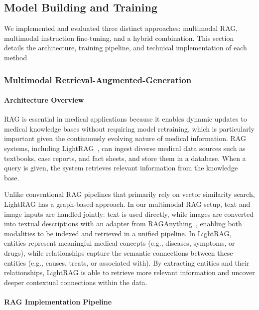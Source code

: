 \subsection{Model Building and Training}
\label{sec:model-building}

We implemented and evaluated three distinct approaches: multimodal \ac{RAG}, multimodal instruction
fine-tuning, and a hybrid combination. This section details the architecture, training pipeline, and technical implementation of each method

\subsubsection{Multimodal Retrieval-Augmented-Generation}
\label{sec:rag-pipeline}

\paragraph{Architecture Overview}

\ac{RAG} is essential in medical applications because it enables dynamic updates to medical knowledge bases without requiring model retraining, which is particularly important given the continuously evolving nature of medical information. \ac{RAG} systems, including LightRAG~\cite{lightrag}, can ingest diverse medical data sources such as textbooks, case reports, and fact sheets, and store them in a database. When a query is given, the system retrieves relevant information from the knowledge base.

Unlike conventional RAG pipelines that primarily rely on vector similarity search, LightRAG has a graph-based approach. In our multimodal RAG setup, text and image inputs are handled jointly: text is used directly, while images are converted into textual descriptions with an adapter from RAGAnything~\cite{raganything}, enabling both modalities to be indexed and retrieved in a unified pipeline. In LightRAG, entities represent meaningful medical concepts (e.g., diseases, symptoms, or drugs), while relationships capture the semantic connections between these entities (e.g., causes, treats, or associated with). By extracting entities and their relationships, LightRAG is able to retrieve more relevant information and uncover deeper contextual connections within the data.

\paragraph{RAG Implementation Pipeline}

